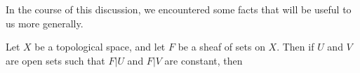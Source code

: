 In the course of this discussion, we encountered some facts that will be useful to us more generally.

\begin{lem}
	Let $ X $ be a topological space, and let $ F $ be a sheaf of sets on $ X $.
	Then if $ U $ and $ V $ are open sets such that $ F | U $ and $ F | V $ are constant, then 
\end{lem}




